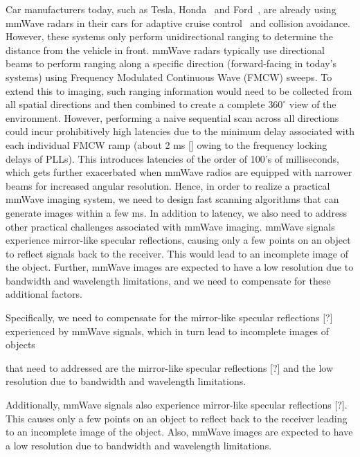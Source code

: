 Car manufacturers today, such as Tesla, Honda~\cite{honda_sensing} and Ford~\cite{ford_acc}, are already using mmWave radars in their cars for adaptive cruise control~\cite{wiki_acc} and collision avoidance. However, these systems only perform unidirectional ranging to determine the distance from the vehicle in front.
mmWave radars typically use directional beams to perform ranging along a specific direction (forward-facing in today's systems) using Frequency Modulated Continuous Wave (FMCW) sweeps. To extend this to imaging, such ranging information would need to be collected from all spatial directions and then combined to create a complete $360^\circ$ view of the environment. However, performing a naive sequential scan across all directions could incur prohibitively high latencies due to the minimum delay associated with each individual FMCW ramp (about 2 ms [] owing to the frequency locking delays of PLLs). This introduces latencies of the order of 100's of milliseconds, which gets further exacerbated when mmWave radios are equipped with narrower beams for increased angular resolution. Hence, in order to realize a practical mmWave imaging system, we need to design fast scanning algorithms that can generate images within a few ms. In addition to latency, we also need to address other practical challenges associated with mmWave imaging. mmWave signals experience 
mirror-like specular reflections, causing only a few points on an object to reflect signals back to the receiver. This would lead to an incomplete image of the object. Further, 
mmWave images are expected to have a low resolution due to bandwidth and wavelength limitations, and we need to compensate for these additional factors.



\iffalse

Specifically, we need to compensate for the mirror-like specular reflections [?] experienced by mmWave signals, which in turn lead to incomplete images of objects

 that need to addressed are the mirror-like specular reflections [?] and the low resolution due to bandwidth and wavelength limitations. 



Additionally, mmWave signals also experience mirror-like specular reflections [?]. This causes only a few points on an object to reflect back to the receiver leading to an incomplete image of the object. Also, mmWave images are expected to have a low resolution due to bandwidth and wavelength limitations.




